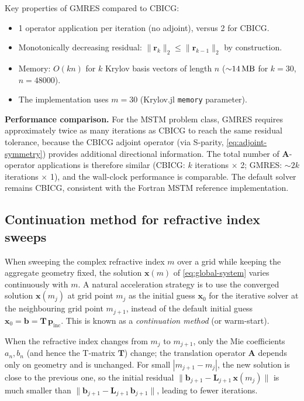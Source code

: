 \documentclass[11pt,a4paper]{article}
\begin{document}
Key properties of GMRES compared to CBICG:
\begin{itemize}
  \item 1 operator application per iteration (no adjoint), versus 2 for CBICG.
  \item Monotonically decreasing residual: $\|\bm{r}_k\|_2 \leq \|\bm{r}_{k-1}\|_2$ by construction.
  \item Memory: $O(kn)$ for $k$ Krylov basis vectors of length $n$ (${\sim}\SI{14}{\mega\byte}$ for $k = 30$, $n = 48000$).
  \item The implementation uses $m = 30$ (Krylov.jl \texttt{memory} parameter).
\end{itemize}

\textbf{Performance comparison.}
For the MSTM problem class, GMRES requires approximately twice as many iterations as CBICG to reach the same residual tolerance, because the CBICG adjoint operator (via S-parity, \eqref{eq:adjoint-symmetry}) provides additional directional information.  The total number of $\mathbf{A}$-operator applications is therefore similar (CBICG: $k$ iterations $\times$ 2; GMRES: $\sim 2k$ iterations $\times$ 1), and the wall-clock performance is comparable.  The default solver remains CBICG, consistent with the Fortran MSTM reference implementation.

\subsection{Continuation method for refractive index sweeps}
\label{sec:continuation}

When sweeping the complex refractive index $m$ over a grid while keeping the aggregate geometry fixed, the solution $\bm{x}(m)$ of \eqref{eq:global-system} varies continuously with $m$.  A natural acceleration strategy is to use the converged solution $\bm{x}(m_j)$ at grid point $m_j$ as the initial guess $\bm{x}_0$ for the iterative solver at the neighbouring grid point $m_{j+1}$, instead of the default initial guess $\bm{x}_0 = \bm{b} = \mathbf{T}\,\bm{p}_\mathrm{inc}$.  This is known as a \emph{continuation method} (or warm-start).

When the refractive index changes from $m_j$ to $m_{j+1}$, only the Mie coefficients $a_n, b_n$ (and hence the T-matrix $\mathbf{T}$) change; the translation operator $\mathbf{A}$ depends only on geometry and is unchanged.  For small $|m_{j+1} - m_j|$, the new solution is close to the previous one, so the initial residual $\|\bm{b}_{j+1} - \mathbf{L}_{j+1}\,\bm{x}(m_j)\|$ is much smaller than $\|\bm{b}_{j+1} - \mathbf{L}_{j+1}\,\bm{b}_{j+1}\|$, leading to fewer iterations.
\end{document}
